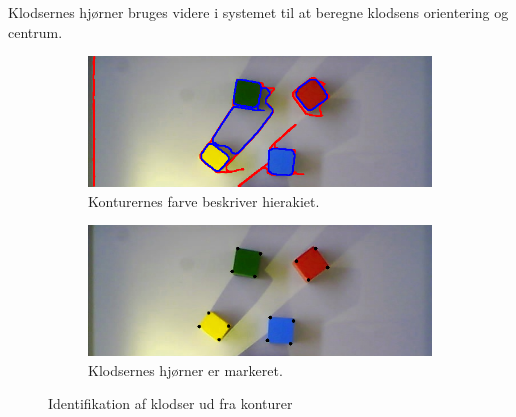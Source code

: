 Klodsernes hjørner bruges videre i systemet til at beregne klodsens orientering og centrum.

\begin{figure}[H]
	\centering
	\begin{subfigure}{.45\textwidth}
		\centering
		\includegraphics[scale=0.3]{images/contours}
		\caption{Konturernes farve beskriver hierakiet.}
	  	\label{fig:contours}
	\end{subfigure}
	\begin{subfigure}{.45\textwidth}
		\centering
		\includegraphics[scale=0.3]{images/blocks}
		\caption{Klodsernes hjørner er markeret.}
		\label{fig:blocks}
	\end{subfigure}
	\caption{Identifikation af klodser ud fra konturer}
	\label{fig:identification}
\end{figure}